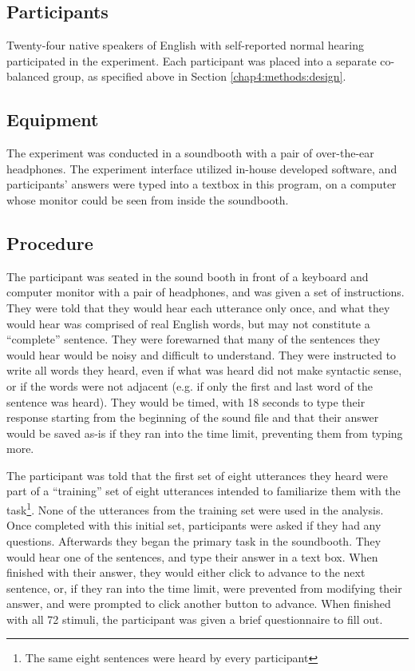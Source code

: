 \documentclass[dissertation,copyright]{uathesis}
\begin{document}
\subsection{Participants}

Twenty-four native speakers of English with self-reported normal hearing participated in the experiment. Each participant was placed into a separate co-balanced group, as specified above in Section \ref{chap4:methods:design}.

\subsection{Equipment}

The experiment was conducted in a soundbooth with a pair of over-the-ear headphones.  The experiment interface utilized in-house developed software, and participants' answers were typed into a textbox in this program, on a computer whose monitor could be seen from inside the soundbooth.

\subsection{Procedure}
\label{hsp-main-procedure}

The participant was seated in the sound booth in front of a keyboard and computer monitor with a pair of headphones, and was given a set of instructions. They were told that they would hear each utterance only once, and what they would hear was comprised of real English words, but may not constitute a ``complete'' sentence.  They were forewarned that many of the sentences they would hear would be noisy and difficult to understand. They were instructed to write all words they heard, even if what was heard did not make syntactic sense, or if the words were not adjacent (e.g. if only the first and last word of the sentence was heard). They would be timed, with 18 seconds to type their response starting from the beginning of the sound file and that their answer would be saved as-is if they ran into the time limit, preventing them from typing more.

The participant was told that the first set of eight utterances they heard were part of a ``training'' set of eight utterances intended to familiarize them with the task\footnote{The same eight sentences were heard by every participant}.  None of the utterances from the training set were used in the analysis.  Once completed with this initial set, participants were asked if they had any questions.  Afterwards they began the primary task in the soundbooth.  They would hear one of the sentences, and type their answer in a text box.  When finished with their answer, they would either click to advance to the next sentence, or, if they ran into the time limit, were prevented from modifying their answer, and were prompted to click another button to advance.  When finished with all 72 stimuli, the participant was given a brief questionnaire to fill out.  
\end{document}
